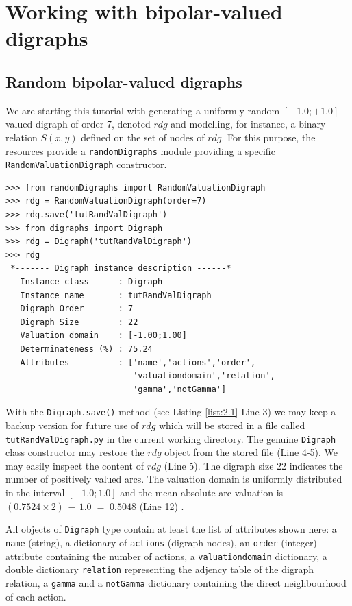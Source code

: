 \chapter{Working with bipolar-valued digraphs}
\label{sec:2}



\section{Random bipolar-valued digraphs}

We are starting this tutorial with generating a uniformly random $[-1.0; +1.0]$-valued digraph of order 7, denoted $rdg$ and modelling, for instance, a binary relation $S(x,y)$ defined on the set of nodes of $rdg$. For this purpose, the \Digraph resources provide a {\tt randomDigraphs} module providing a specific {\tt RandomValuationDigraph} constructor.
\begin{lstlisting}[caption={Random bipolar-valued digraph instance},label=list:2.1]
>>> from randomDigraphs import RandomValuationDigraph
>>> rdg = RandomValuationDigraph(order=7)
>>> rdg.save('tutRandValDigraph')
>>> from digraphs import Digraph
>>> rdg = Digraph('tutRandValDigraph')
>>> rdg
 *------- Digraph instance description ------*
   Instance class      : Digraph
   Instance name       : tutRandValDigraph
   Digraph Order       : 7
   Digraph Size        : 22
   Valuation domain    : [-1.00;1.00]
   Determinateness (%) : 75.24
   Attributes          : ['name','actions','order',
                          'valuationdomain','relation',
                          'gamma','notGamma']
\end{lstlisting}   

With the {\tt Digraph.save()} method (see Listing \ref{list:2.1} Line 3) we may keep a backup version for future use of $rdg$ which will be stored in a file called {\tt tutRandValDigraph.py} in the current working directory. The genuine {\tt Digraph} class constructor may restore the $rdg$ object from the stored file (Line 4-5). We may easily inspect the content of $rdg$ (Line 5). The digraph size 22 indicates the number of positively valued arcs. The valuation domain is uniformly distributed in the interval $[-1.0; 1.0]$ and the mean absolute arc valuation is $(0.7524 \times 2)\, -\, 1.0 \;=\; 0.5048$ (Line 12) .

All objects of {\tt Digraph} type contain at least the list of attributes shown here: a \texttt{name} (string), a dictionary of \texttt{actions} (digraph nodes), an \texttt{order} (integer) attribute containing the number of actions, a \texttt{valuationdomain} dictionary, a double dictionary \texttt{relation} representing the adjency table of the digraph relation, a \texttt{gamma} and a {\tt notGamma} dictionary containing the direct neighbourhood of each action.


